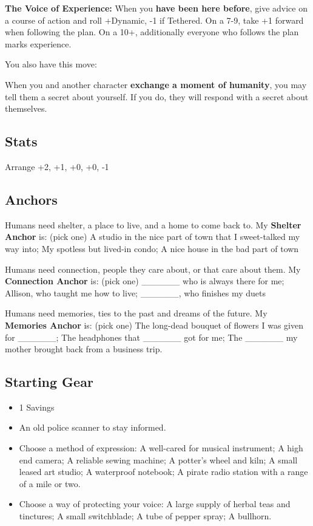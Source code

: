 \documentclass[
]{memoir}
\begin{document}
\textbf{The Voice of Experience:} When you \textbf{have been here
before}, give advice on a course of action and roll +Dynamic, -1 if
Tethered. On a 7-9, take +1 forward when following the plan. On a 10+,
additionally everyone who follows the plan marks experience.

You also have this move:

When you and another character \textbf{exchange a moment of humanity},
you may tell them a secret about yourself. If you do, they will respond
with a secret about themselves.

\hypertarget{stats-8}{%
\subsection{Stats}\label{stats-8}}

Arrange +2, +1, +0, +0, -1

\hypertarget{anchors-7}{%
\subsection{Anchors}\label{anchors-7}}

Humans need shelter, a place to live, and a home to come back to. My
\textbf{Shelter Anchor} is: (pick one) A studio in the nice part of town
that I sweet-talked my way into; My spotless but lived-in condo; A nice
house in the bad part of town

Humans need connection, people they care about, or that care about them.
My \textbf{Connection Anchor} is: (pick one) \_\_\_\_\_\_ who is always
there for me; Allison, who taught me how to live; \_\_\_\_\_\_, who
finishes my duets

Humans need memories, ties to the past and dreams of the future. My
\textbf{Memories Anchor} is: (pick one) The long-dead bouquet of flowers
I was given for \_\_\_\_\_\_; The headphones that \_\_\_\_\_\_ got for
me; The \_\_\_\_\_\_ my mother brought back from a business trip.

\hypertarget{starting-gear-7}{%
\subsection{Starting Gear}\label{starting-gear-7}}

\begin{itemize}
\tightlist
\item
  1 Savings
\item
  An old police scanner to stay informed.
\item
  Choose a method of expression: A well-cared for musical instrument; A
  high end camera; A reliable sewing machine; A potter's wheel and kiln;
  A small leased art studio; A waterproof notebook; A pirate radio
  station with a range of a mile or two.
\item
  Choose a way of protecting your voice: A large supply of herbal teas
  and tinctures; A small switchblade; A tube of pepper spray; A
  bullhorn.
\end{itemize}
\end{document}
